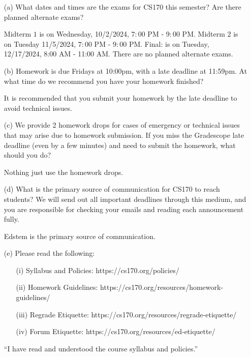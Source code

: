 \documentclass{article}
\begin{document}
    \begin{itemize}
        \item [(a)] What dates and times are the exams for CS170 this semester? Are there planned alternate exams?
            \begin{answer}
                Midterm $1$ is on  Wednesday, 10/2/2024, $7:00$ PM - $9:00$ PM. Midterm $2$ is on Tuesday 11/5/2024, $7:00$ PM - $9:00$ PM. Final: is on Tuesday, 12/17/2024, 8:00 AM - 11:00 AM. There are no planned alternate exams.
            \end{answer}

        \item [(b)] Homework is due Fridays at 10:00pm, with a late deadline at 11:59pm. At what time do we recommend you have your homework finished?
            \begin{answer}
                It is recommended that you submit your homework by the late deadline to avoid technical issues.
            \end{answer}

        \item [(c)] We provide 2 homework drops for cases of emergency or technical issues that may arise due to homework submission. If you miss the Gradescope late deadline (even by a few minutes) and need to submit the homework, what should you do?
            \begin{answer}
                Nothing just use the homework drops.
            \end{answer}

        \item [(d)] What is the primary source of communication for CS170 to reach students? We will send out all important deadlines through this medium, and you are responsible for checking your emails and reading each announcement fully.
            \begin{answer}
                Edstem is the primary source of communication. 
            \end{answer}

        \item [(e)] Please read the following:
            \begin{itemize}
                \item [(i)] Syllabus and Policies: https://cs170.org/policies/

                \item [(ii)] Homework Guidelines: https://cs170.org/resources/homework-guidelines/

                \item [(iii)] Regrade Etiquette: https://cs170.org/resources/regrade-etiquette/


                \item [(iv)] Forum Etiquette: https://cs170.org/resources/ed-etiquette/ 
            \end{itemize}
            “I have read and understood the course syllabus and policies.”

    \end{itemize}
\end{document}
